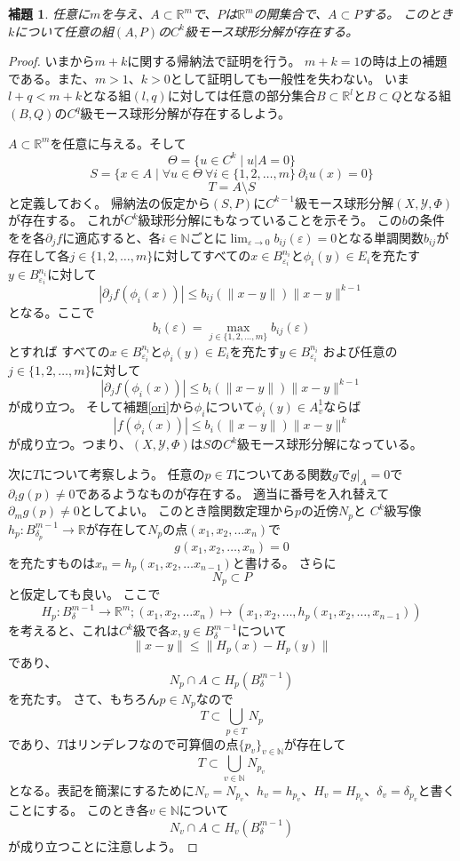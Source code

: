 \documentclass[leqno]{jsarticle}
\newtheorem{lem}[thm]{補題}
\newcommand{\nn}{\mathbb{N}}
\newcommand{\rr}{\mathbb{R}}
\newcommand{\ep}{\varepsilon}
\begin{document}
\begin{lem}\label{nx}
任意に$m$を与え、$A\subset \rr^m$で、$P$は$\rr^m$の開集合で、$A\subset P$する。
このとき$k$について任意の組$(A,P)$の$C^k$級モース球形分解が存在する。
\end{lem}
\begin{proof}
いまから$m+k$に関する帰納法で証明を行う。
$m+k=1$の時は上の補題である。また、$m>1$、$k>0$として証明しても一般性を失わない。
いま$l+q<m+k$となる組$(l,q)$に対しては任意の部分集合$B\subset \rr^l$と$B\subset Q$となる組$(B,Q)$の$C^q$級モース球形分解が存在するしよう。
\par
$A\subset \rr^m$を任意に与える。そして
\[
\Theta=\{u\in C^k\mid u|A=0\}
\]
\[
S=\{x\in A\mid\forall u\in \Theta\ \forall i\in \{1,2,\dots, m\}\  \partial_iu (x)=0\}
\]
\[
T=A\setminus S
\]
と定義しておく。
帰納法の仮定から$(S,P)$に$C^{k-1}$級モース球形分解$(X,\mathcal{Y},\Phi)$が存在する。
これが$C^{k}$級球形分解にもなっていることを示そう。
この$b$の条件をを各$\partial_j f$に適応すると、各$i\in \nn$ごとに$\lim_{\ep\to 0}b_{ij}(\ep)=0$となる単調関数$b_{ij}$が存在して各$j\in \{1,2,\dots, m\}$に対してすべての$x\in B_{\ep_i}^{n_i}$と$\phi_i(y)\in E_i$を充たす$y\in B_{\ep_i}^{n_i}$に対して
\[
|\partial_jf(\phi_i(x))|\le b_{ij}(\|x-y\|)\|x-y\|^{k-1}
\]
となる。ここで
\[
b_i(\ep)=\max_{j\in \{1,2,\dots, m\}}b_{ij}(\ep)
\]
とすれば
すべての$x\in B_{\ep_i}^{n_i}$と$\phi_i(y)\in E_i$を充たす$y\in B_{\ep_i}^{n_i}$
および任意の$j\in \{1,2,\dots,m\}$に対して
\[
|\partial_jf(\phi_i(x))|\le b_{i}(\|x-y\|)\|x-y\|^{k-1}
\]
が成り立つ。
そして補題\ref{ori}から$\phi_i$について$\phi_i(y)\in A^1_v$ならば
\[
|f(\phi_i(x))|\le b_i(\|x-y\|)\|x-y\|^k
\]
が成り立つ。つまり、$(X,\mathcal{Y},\Phi)$は$S$の$C^k$級モース球形分解になっている。
\par
次に$T$について考察しよう。
任意の$p\in T$についてある関数$g$で$g|_A=0$で$\partial_i g(p)\neq 0$であるようなものが存在する。
適当に番号を入れ替えて$\partial_mg(p)\neq 0$としてよい。
このとき陰関数定理から$p$の近傍$N_p$と
$C^k$級写像$h_p:B_{\delta_p}^{m-1}\to \rr$が存在して$N_p$の点$(x_1,x_2,\dots x_n)$で
\[
g(x_1,x_2,\dots,x_n)=0
\]
を充たすものは$x_n=h_p(x_1,x_2,\dots x_{n-1})$と書ける。
さらに
\[
N_p\subset P
\]
と仮定しても良い。
ここで
\[
H_p:B_{\delta}^{m-1}\to \rr^m; (x_1,x_2,\dots x_n)\mapsto (x_1,x_2,\dots ,h_p(x_1,x_2,\dots, x_{n-1}))
\]
を考えると、これは$C^k$級で各$x,y\in B_{\delta}^{m-1}$について
\[
\|x-y\|\le\|H_p(x)-H_p(y)\|
\]
であり、
\[
N_p\cap A\subset H_p(B_{\delta}^{m-1})
\]
を充たす。
さて、もちろん$p\in N_p$なので
\[
T\subset \bigcup_{p\in T}N_p
\]
であり、$T$はリンデレフなので可算個の点$\{p_v\}_{v\in \nn}$が存在して
\[
T\subset \bigcup_{v\in \nn}N_{p_v}
\]
となる。表記を簡潔にするために$N_v=N_{p_v}$、$h_v=h_{p_v}$、$H_v=H_{p_v}$、$\delta_v=\delta_{p_v}$と書くことにする。
このとき各$v\in \nn$について
\[
N_v\cap A\subset H_v(B_{\delta}^{m-1})
\]
が成り立つことに注意しよう。


\end{proof}
\end{document}
